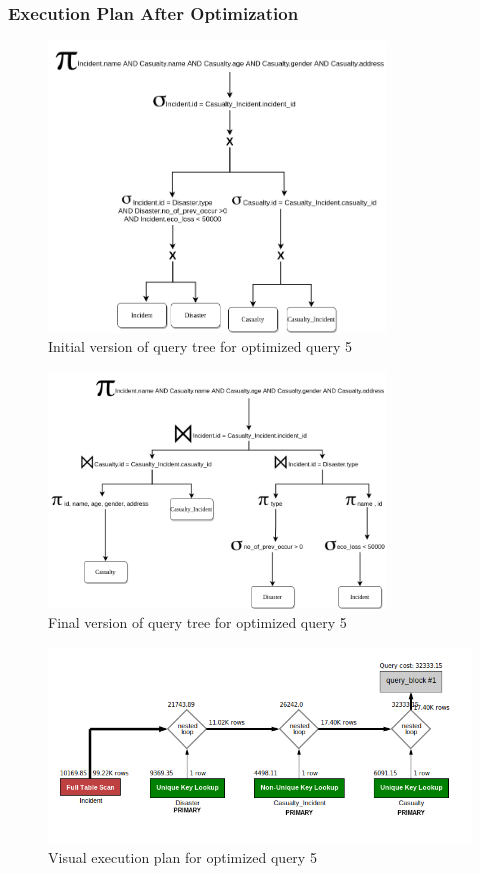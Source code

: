 \subsubsection{Execution Plan After Optimization}
\begin{figure}[H]
    \centering
    \includegraphics[width=0.8\textwidth]{images/query_trees/query5-optimized-initial-version.png}
    \caption{Initial version of query tree for optimized query 5}
\end{figure}
\begin{figure}[H]
    \centering
    \includegraphics[width=0.8\textwidth]{images/query_trees/query5-optimized-final-version.png}
    \caption{Final version of query tree for optimized query 5}
\end{figure}
\begin{figure}[H]
    \centering
    \includegraphics[width=\textwidth]{images/execution_plans/q5-4-new.png}
    \caption{Visual execution plan for optimized query 5}
\end{figure}

